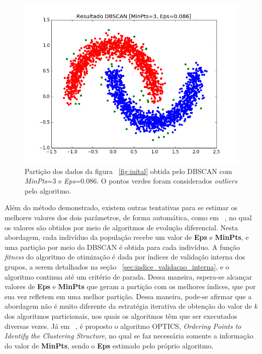 \begin{figure}[h!]
	\includegraphics[width=\linewidth]{figuras/result.png}
	\caption{Partição dos dados da figura ~\ref{fig:inital} obtida pelo DBSCAN com \emph{MinPts}=$3$ e \emph{Eps}=$0.086$. O pontos verdes foram considerados \emph{outliers} pelo algoritmo.}
	\label{fig:result}
\end{figure}

Além do método demonstrado, existem outras tentativas para se estimar os melhores valores dos dois parâmetros, de forma automática, como em ~\parencite{DE_DBSCAN}, no qual os valores são obtidos por meio de algoritmos de evolução diferencial. Nesta abordagem, cada indivíduo da população recebe um valor de \textbf{Eps} e \textbf{MinPts}, e uma partição por meio do DBSCAN é obtida para cada indivíduo. A função \emph{fitness} do algoritmo de otimização é dada por índices de validação interna dos grupos, a serem detalhados na seção ~\ref{sec:indice_validacao_interna}, e o algoritmo continua até um critério de parada. Dessa maneira, espera-se alcançar valores de  \textbf{Eps} e \textbf{MinPts} que geram a partição com os melhores índices, que por sua vez refletem em uma melhor partição. Dessa maneira, pode-se afirmar que a abordagem não é muito diferente da estratégia iterativa de obtenção do valor de $k$ dos algoritmos particionais, nos quais os algoritmos têm que ser executados diversas vezes. Já em ~\parencite{OPTICS}, é proposto o algoritmo OPTICS, \emph{Ordering Points to Identify the Clustering Structure}, no qual se faz necessária somente a informação do valor de \textbf{MinPts}, sendo o \textbf{Eps} estimado pelo próprio algoritmo. 

